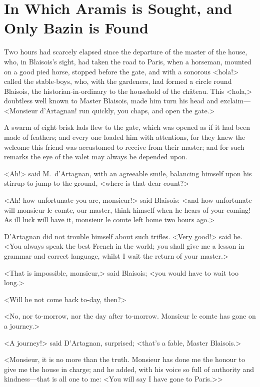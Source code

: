 \chapter{In Which Aramis is Sought, and Only Bazin is Found}

\lettrine{T}{wo} hours had scarcely elapsed since the departure of the master of the house, who, in Blaisois's sight, had taken the road to Paris, when a horseman, mounted on a good pied horse, stopped before the gate, and with a sonorous <hola!> called the stable-boys, who, with the gardeners, had formed a circle round Blaisois, the historian-in-ordinary to the household of the château. This <hola,> doubtless well known to Master Blaisois, made him turn his head and exclaim—<Monsieur d'Artagnan! run quickly, you chaps, and open the gate.>

A swarm of eight brisk lads flew to the gate, which was opened as if it had been made of feathers; and every one loaded him with attentions, for they knew the welcome this friend was accustomed to receive from their master; and for such remarks the eye of the valet may always be depended upon.

<Ah!> said M.~d'Artagnan, with an agreeable smile, balancing himself upon his stirrup to jump to the ground, <where is that dear count?>

<Ah! how unfortunate you are, monsieur!> said Blaisois: <and how unfortunate will monsieur le comte, our master, think himself when he hears of your coming! As ill luck will have it, monsieur le comte left home two hours ago.>

D'Artagnan did not trouble himself about such trifles. <Very good!> said he. <You always speak the best French in the world; you shall give me a lesson in grammar and correct language, whilst I wait the return of your master.>

<That is impossible, monsieur,> said Blaisois; <you would have to wait too long.>

<Will he not come back to-day, then?>

<No, nor to-morrow, nor the day after to-morrow. Monsieur le comte has gone on a journey.>

<A journey!> said D'Artagnan, surprised; <that's a fable, Master Blaisois.>

<Monsieur, it is no more than the truth. Monsieur has done me the honour to give me the house in charge; and he added, with his voice so full of authority and kindness—that is all one to me: <You will say I have gone to Paris.>>


